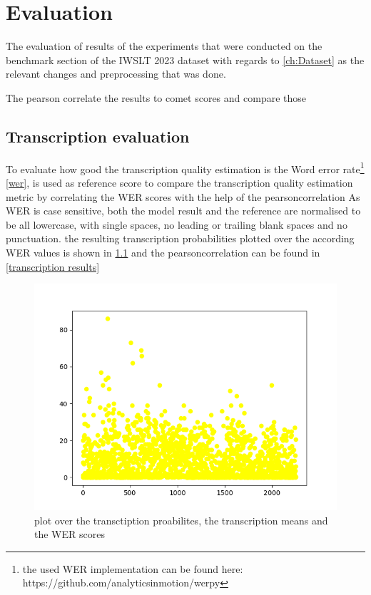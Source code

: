 
\chapter{Evaluation}
\label{ch:Evaluation}
The evaluation of results of the experiments that were conducted on the benchmark section of the IWSLT 2023 dataset \cite{sperber2024evaluating} with regards to \ref{ch:Dataset} as the relevant changes and preprocessing that was done.

The
pearson correlate \cite{2020SciPy-NMeth} the results to comet scores and compare those 


\section{Transcription evaluation}
To evaluate how good the transcription quality estimation is the Word error rate\footnote{the used WER implementation can be found here: https://github.com/analyticsinmotion/werpy} \ref{wer}, is used as reference score to compare the transcription quality estimation metric by correlating the WER scores with the help of the pearsoncorrelation \cite{2020SciPy-NMeth}
As WER is case sensitive, both the model result and the reference are normalised to be all lowercase, with single spaces, no leading or trailing blank spaces and no punctuation.
the resulting transcription probabilities plotted over the according WER values is shown in \ref{fig:transcript scatter plot} and the pearsoncorrelation can be found in \ref{transcription results}
\begin{figure}
    \centering
    \includegraphics[width=0.5\linewidth]{Latex/sections/images/seamlesswerref.png}
    \caption{plot over the transctiption proabilites, the transcription means and the WER scores}
    \label{fig:transcript scatter plot}
\end{figure}

